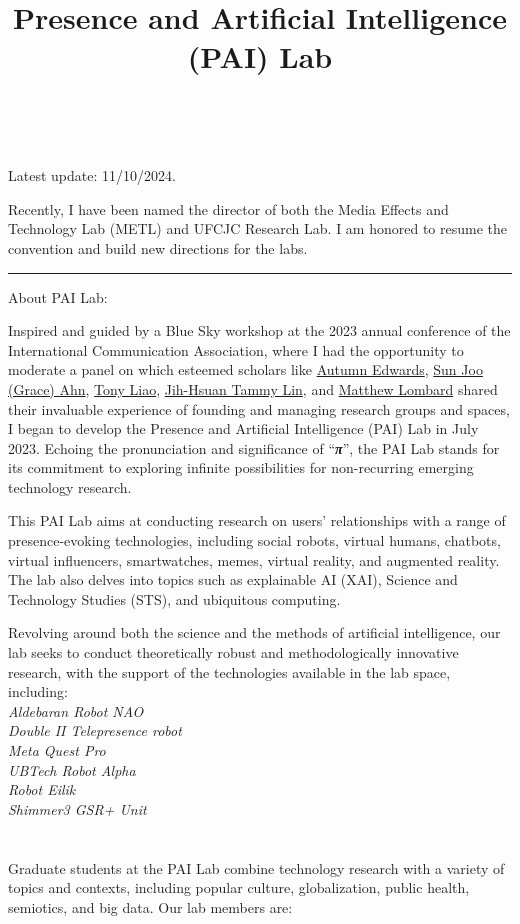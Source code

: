 \documentclass[]{article}
\title{Presence and Artificial Intelligence (PAI) Lab}
\author{}
\date{\vspace{-2.5em}}
\begin{document}
\maketitle

~

Latest update: 11/10/2024.

Recently, I have been named the director of both the Media Effects and
Technology Lab (METL) and UFCJC Research Lab. I am honored to resume the
convention and build new directions for the labs.

\begin{center}\rule{0.5\linewidth}{0.5pt}\end{center}

About PAI Lab:

Inspired and guided by a Blue Sky workshop at the 2023 annual conference
of the International Communication Association, where I had the
opportunity to moderate a panel on which esteemed scholars like
\href{https://wmich.edu/communication/directory/edwards}{Autumn
Edwards}, \href{https://grady.uga.edu/faculty/sun-joo-grace-ahn/}{Sun
Joo (Grace) Ahn},
\href{https://dot.egr.uh.edu/departments/ilt/people/faculty/liao-tony}{Tony
Liao}, \href{https://drtammylin.com/}{Jih-Hsuan Tammy Lin}, and
\href{https://klein.temple.edu/directory/matthew-lombard-lombard}{Matthew
Lombard} shared their invaluable experience of founding and managing
research groups and spaces, I began to develop the Presence and
Artificial Intelligence (PAI) Lab in July 2023. Echoing the
pronunciation and significance of ``\textbf{\emph{π}}'', the PAI Lab
stands for its commitment to exploring infinite possibilities for
non-recurring emerging technology research.

This PAI Lab aims at conducting research on users' relationships with a
range of presence-evoking technologies, including social robots, virtual
humans, chatbots, virtual influencers, smartwatches, memes, virtual
reality, and augmented reality. The lab also delves into topics such as
explainable AI (XAI), Science and Technology Studies (STS), and
ubiquitous computing.

Revolving around both the science and the methods of artificial
intelligence, our lab seeks to conduct theoretically robust and
methodologically innovative research, with the support of the
technologies available in the lab space, including:\\
\emph{Aldebaran Robot NAO}\\
\emph{Double II Telepresence robot}\\
\emph{Meta Quest Pro}\\
\emph{UBTech Robot Alpha}\\
\emph{Robot Eilik}\\
\emph{Shimmer3 GSR+ Unit}\\
~\\
~\\
Graduate students at the PAI Lab combine technology research with a
variety of topics and contexts, including popular culture,
globalization, public health, semiotics, and big data. Our lab members
are:
\end{document}
